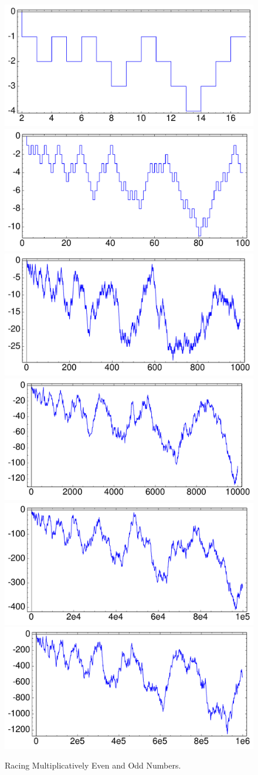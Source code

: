 \documentclass[openany]{book}
\theoremstyle{plain}
\theoremstyle{definition}
\begin{document}
 \begin{figure}[H]
\centering
\includegraphics[width=.4\textwidth]{illustrations/liouville-17}
\includegraphics[width=.4\textwidth]{illustrations/liouville-100}\\
\includegraphics[width=.4\textwidth]{illustrations/liouville-1000}
\includegraphics[width=.4\textwidth]{illustrations/liouville-10000}\\
\includegraphics[width=.4\textwidth]{illustrations/liouville-100000}
\includegraphics[width=.4\textwidth]{illustrations/liouville-1000000}\\
\caption{Racing Multiplicatively Even and Odd Numbers.\label{fig:liouville}}
\end{figure} 
  
\end{document}
